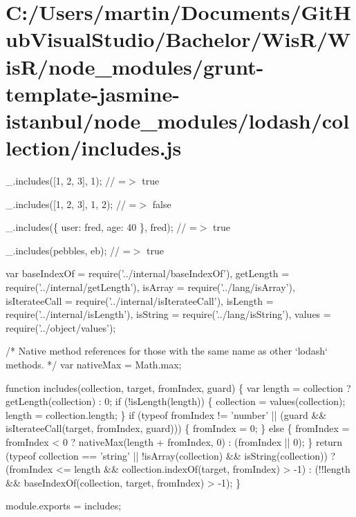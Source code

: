\hypertarget{_c_1_2_users_2martin_2_documents_2_git_hub_visual_studio_2_bachelor_2_wis_r_2_wis_r_2node_moduleaa2cefc786c7d8a6bf6cf943f6676680}{}\section{C\+:/\+Users/martin/\+Documents/\+Git\+Hub\+Visual\+Studio/\+Bachelor/\+Wis\+R/\+Wis\+R/node\+\_\+modules/grunt-\/template-\/jasmine-\/istanbul/node\+\_\+modules/lodash/collection/includes.\+js}
\+\_\+.\+includes(\mbox{[}1, 2, 3\mbox{]}, 1); // =$>$ true

\+\_\+.\+includes(\mbox{[}1, 2, 3\mbox{]}, 1, 2); // =$>$ false

\+\_\+.\+includes(\{ \textquotesingle{}user\textquotesingle{}\+: \textquotesingle{}fred\textquotesingle{}, \textquotesingle{}age\textquotesingle{}\+: 40 \}, \textquotesingle{}fred\textquotesingle{}); // =$>$ true

\+\_\+.\+includes(\textquotesingle{}pebbles\textquotesingle{}, \textquotesingle{}eb\textquotesingle{}); // =$>$ true


\begin{DoxyCodeInclude}
var baseIndexOf = require(\textcolor{stringliteral}{'../internal/baseIndexOf'}),
    getLength = require(\textcolor{stringliteral}{'../internal/getLength'}),
    isArray = require(\textcolor{stringliteral}{'../lang/isArray'}),
    isIterateeCall = require(\textcolor{stringliteral}{'../internal/isIterateeCall'}),
    isLength = require(\textcolor{stringliteral}{'../internal/isLength'}),
    isString = require(\textcolor{stringliteral}{'../lang/isString'}),
    values = require(\textcolor{stringliteral}{'../object/values'});

\textcolor{comment}{/* Native method references for those with the same name as other `lodash` methods. */}
var nativeMax = Math.max;

\textcolor{keyword}{function} includes(collection, target, fromIndex, guard) \{
  var length = collection ? getLength(collection) : 0;
  \textcolor{keywordflow}{if} (!isLength(length)) \{
    collection = values(collection);
    length = collection.length;
  \}
  \textcolor{keywordflow}{if} (typeof fromIndex != \textcolor{stringliteral}{'number'} || (guard && isIterateeCall(target, fromIndex, guard))) \{
    fromIndex = 0;
  \} \textcolor{keywordflow}{else} \{
    fromIndex = fromIndex < 0 ? nativeMax(length + fromIndex, 0) : (fromIndex || 0);
  \}
  \textcolor{keywordflow}{return} (typeof collection == \textcolor{stringliteral}{'string'} || !isArray(collection) && isString(collection))
    ? (fromIndex <= length && collection.indexOf(target, fromIndex) > -1)
    : (!!length && baseIndexOf(collection, target, fromIndex) > -1);
\}

module.exports = includes;
\end{DoxyCodeInclude}
 